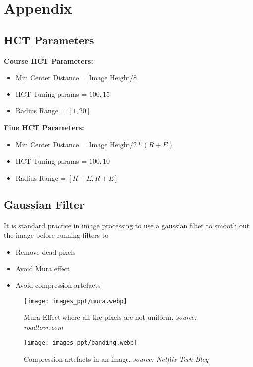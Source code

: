 \documentclass[hidelinks]{book}
\numberwithin{equation}{section}
\begin{document}
\section{Appendix}\label{sec:app}
\subsection{HCT Parameters}\label{appen:param}
\textbf{Course HCT Parameters:}
\begin{itemize}
  \item Min Center Distance = $\text{Image Height} / 8$
  \item HCT Tuning params = $100, 15$
  \item Radius Range = $[1, 20]$
\end{itemize}

\textbf{Fine HCT Parameters:}
\begin{itemize}
  \item Min Center Distance = $\text{Image Height} / 2 * (R + E)$
  \item HCT Tuning params = $100, 10$
  \item Radius Range = $[R - E, R + E]$
\end{itemize}

\subsection{Gaussian Filter}\label{appen:gaussian}
It is standard practice in image processing to use a gaussian filter to smooth out the image before running filters to

\begin{itemize}
  \item Remove dead pixels
  \item Avoid Mura effect
  \item Avoid compression artefacts
\end{itemize}

\begin{figure}[H]
  \centering
  \texttt{[image: images\_ppt/mura.webp]}
  \caption{Mura Effect where all the pixels are not uniform. \textit{source: roadtovr.com}}
\end{figure}

\begin{figure}[H]
  \centering
  \texttt{[image: images\_ppt/banding.webp]}
  \caption{Compression artefacts in an image. \textit{source: Netflix Tech Blog}}
\end{figure}

\nocite{*}
\printbibliography
\end{document}
